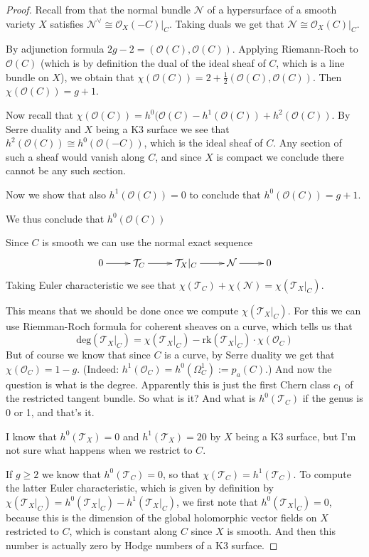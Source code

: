 \begin{proof}
Recall from \cite[p. 146]{gri} that the normal bundle
$\mathcal{N}$ of a hypersurface of a smooth variety $X$ satisfies
$\mathcal{N}^\vee\cong\mathcal{O}_X(-C)|_{C}$. Taking duals we get that
$\mathcal{N}\cong\mathcal{O}_X(C)|_{C}$.

By adjunction formula $2g-2=(\mathcal{O}(C),\mathcal{O}(C))$. 
Applying Riemann-Roch
to $\mathcal{O}(C)$ (which is by definition the dual of the ideal sheaf of $C$,
which is a line bundle on $X$), we obtain that
$\chi(\mathcal{O}(C))=2+\frac{1}{2}(\mathcal{O}(C),\mathcal{O}(C))$. Then
$\chi(\mathcal{O}(C))=g+1$.

Now recall that $\chi(\mathcal{O}(C))=h^0(\mathcal{O}(C)
-h^1(\mathcal{O}(C))+h^2(\mathcal{O}(C))$. By Serre duality and $X$ being a K3
surface we see that $h^2(\mathcal{O}(C))\cong h^{0}(\mathcal{O}(-C))$, which is
the ideal sheaf of $C$. Any section of such a sheaf would vanish along $C$, and
since $X$ is compact we conclude there cannot be any such section.

Now we show that also $h^1(\mathcal{O}(C))=0$ to conclude that
$h^0(\mathcal{O}(C))=g+1$. 

We thus conclude that $h^0(\mathcal{O}(C))$




Since $C$ is smooth we can use the normal exact sequence
$$
\xymatrix{
0\ar[r]&\mathcal{T}_C\ar[r]&\mathcal{T}_X|_{C}\ar[r]&\mathcal{N}\ar[r]&0
}
$$
Taking Euler characteristic we see that
$\chi(\mathcal{T}_C)+\chi(\mathcal{N})=\chi(\mathcal{T}_X|_{C})$.


This means that we should be done once we compute $\chi(\mathcal{T}_X|_{C})$. 
For this we can use Riemman-Roch formula for coherent sheaves on a curve, which
tells us that
$$
\text{deg}(\mathcal{T}_X|_{C})=\chi(\mathcal{T}_X|_{C})
-\text{rk}(\mathcal{T}_X|_{C})\cdot\chi(\mathcal{O}_C)
$$
But of course we know that since $C$ is a curve, by Serre duality we get that
$\chi(\mathcal{O}_C)=1-g$. (Indeed:
$h^1(\mathcal{O}_C)=h^0(\Omega^1_C):=p_a(C)$.) And now the question is what is
the degree. Apparently this is just the first Chern class $c_1$ of the
restricted tangent bundle. So what is it? And what is $h^0(\mathcal{T}_C)$ if
the genus is 0 or 1, and that's it.

I
know that $h^0(\mathcal{T}_X)=0$ and $h^1(\mathcal{T}_X)=20$ by $X$ being a K3
surface, but I'm not sure what happens when we restrict to $C$.

If $g \geq 2$ we know that $h^0(\mathcal{T}_C)=0$, so that
$\boxed{\chi(\mathcal{T}_C)=h^1(\mathcal{T}_C)}$.
\bigskip
To compute the
latter Euler characteristic, which is given by definition by
$\chi(\mathcal{T}_X|_{C})=h^0(\mathcal{T}_X|_{C})-h^1(\mathcal{T}_X|_{C})$, we
first note that $h^0(\mathcal{T}_X|_{C})=0$, because this is the dimension of
the global holomorphic vector fields on $X$
restricted to $C$, which is constant along $C$ since $X$ is
smooth. And then this number is actually zero by Hodge numbers of a K3 surface.


\end{proof}

